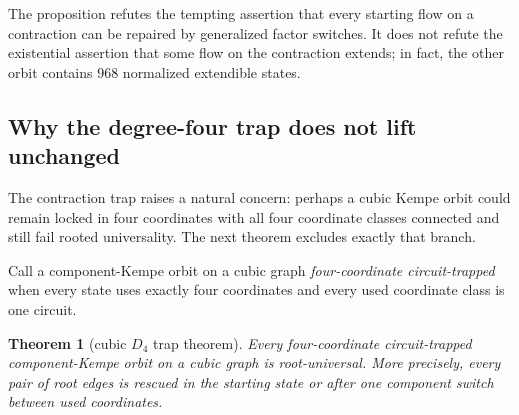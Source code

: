 \documentclass[11pt]{article}
\newtheorem{theorem}{Theorem}
\theoremstyle{definition}
\theoremstyle{remark}
\begin{document}
The proposition refutes the tempting assertion that every starting flow
on a contraction can be repaired by generalized factor switches.  It
does not refute the existential assertion that some flow on the
contraction extends; in fact, the other orbit contains 968 normalized
extendible states.

\subsection{Why the degree-four trap does not lift unchanged}

The contraction trap raises a natural concern: perhaps a cubic Kempe orbit
could remain locked in four coordinates with all four coordinate classes
connected and still fail rooted universality.  The next theorem excludes
exactly that branch.

Call a component-Kempe orbit on a cubic graph
\emph{four-coordinate circuit-trapped} when every state uses exactly four
coordinates and every used coordinate class is one circuit.

\begin{theorem}[cubic \(D_4\) trap theorem]\label{thm:d4-trap}
Every four-coordinate circuit-trapped component-Kempe orbit on a cubic
graph is root-universal.  More precisely, every pair of root edges is
rescued in the starting state or after one component switch between used
coordinates.
\end{theorem}
\end{document}
